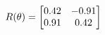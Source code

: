 \documentclass[preview]{standalone}
\begin{document}
\begin{align*}
\special{dvisvgm:raw <g id='unique000'>}R(\theta) = \begin{bmatrix}0.42 & -0.91\\0.91 & 0.42\end{bmatrix}\special{dvisvgm:raw </g>}
\end{align*}
\end{document}

